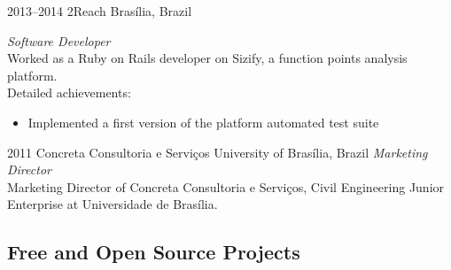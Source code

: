 \documentclass[print]{friggeri-cv}
\begin{document}
\begin{entrylist}

\entry
{2013--2014}
{2Reach}
{Brasília, Brazil}
{\emph{Software Developer} \\
  Worked as a Ruby on Rails developer on Sizify, a function points analysis
  platform. \\
Detailed achievements:
\begin{itemize}
  \item Implemented a first version of the platform automated test suite
\end{itemize}}


\end{entrylist}
\begin{entrylist}

\entry
{2011}
{Concreta Consultoria e Serviços}
{University of Brasília, Brazil}
{\emph{Marketing Director} \\
Marketing Director of Concreta Consultoria e Serviços, Civil Engineering Junior
  Enterprise at Universidade de Brasília. \\
}


\end{entrylist}

\subsection{Free and Open Source Projects}
\end{document}
